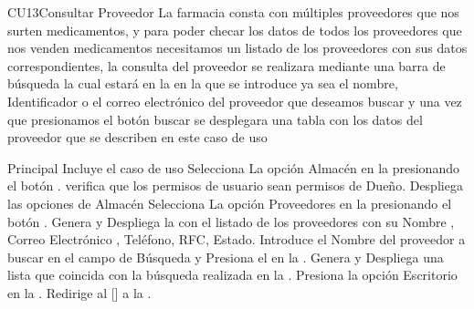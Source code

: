 \begin{UseCase}{CU13}{Consultar Proveedor}{
		La farmacia consta con múltiples proveedores que nos surten medicamentos,  y para poder checar los datos de todos los proveedores que nos venden medicamentos necesitamos un listado de los proveedores con sus datos correspondientes, la consulta del proveedor se realizara mediante una barra de búsqueda la cual estará en la   en la que se introduce ya sea el nombre, Identificador o el correo electrónico del proveedor que deseamos buscar y una vez que presionamos el botón buscar se desplegara una tabla con los datos del proveedor que se describen en este caso de uso
	}
	\end{UseCase}
	\begin{UCtrayectoria}{Principal}
		\UCpaso Incluye el caso de uso 
		\UCpaso[\UCactor] Selecciona La opción Almacén en la  presionando el botón .
		\UCpaso verifica que los permisos de usuario sean permisos de Dueño. 
		\UCpaso Despliega las opciones de Almacén  
		\UCpaso [\UCactor] Selecciona La opción Proveedores en la  presionando el botón .
		\UCpaso Genera y Despliega la  con el listado de los proveedores con su Nombre , Correo Electrónico , Teléfono, RFC, Estado.
		\UCpaso[\UCactor] Introduce el Nombre del proveedor a buscar en el campo de Búsqueda y Presiona el  en la .
		\UCpaso Genera y Despliega una lista que coincida con la búsqueda realizada en la . 
		\UCpaso [\UCactor] Presiona la opción Escritorio en la .
		\UCpaso Redirige al [\UCactor] a la  .
	\end{UCtrayectoria}

